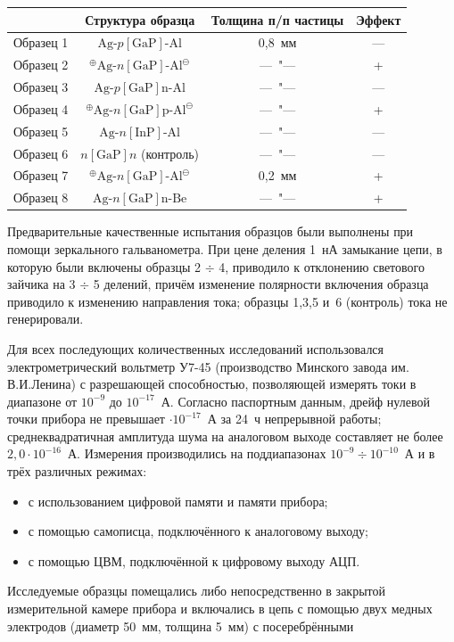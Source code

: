 \documentclass[12pt,a4paper]{article}
\begin{document}
\begin{table}[h]
\centering
\begin{tabular}{|l|c|c|c|}
\hline
& Структура образца & Толщина п/п частицы & Эффект \\
\hline
Образец 1 & $\text{Ag-}p[\text{GaP}]\text{-Al}$ & 0,8~мм & --- \\
Образец 2 & ${}^{\oplus}\text{Ag-}n[\text{GaP}]\text{-Al}^{\ominus}$ & ---~"--- & + \\
Образец 3 & $\text{Ag-}p[\text{GaP}]\text{n-Al}$ & ---~"--- & --- \\
Образец 4 & ${}^{\oplus}\text{Ag-}n[\text{GaP}]\text{p-Al}^{\ominus}$ & ---~"--- & + \\
Образец 5 & $\text{Ag-}n[\text{InP}]\text{-Al}$ & ---~"--- & --- \\
Образец 6 & $n[\text{GaP}]n$ (контроль) & ---~"--- & --- \\
Образец 7 & ${}^{\oplus}\text{Ag-}n[\text{GaP}]\text{-Al}^{\ominus}$ & 0,2~мм & + \\
Образец 8 & $\text{Ag-}n[\text{GaP}]\text{n-Be}$ & ---~"--- & + \\
\hline
\end{tabular}
\end{table}

Предварительные качественные испытания образцов были выполнены при помощи
зеркального гальванометра. При цене деления 1~нА замыкание цепи, в которую
были включены образцы 2 $\div$ 4, приводило к отклонению светового зайчика на
3 $\div$ 5 делений, причём изменение полярности включения образца приводило к
изменению направления тока; образцы 1,3,5 и~6 (контроль) тока не генерировали.

Для всех последующих количественных исследований использовался
электрометрический вольтметр У7-45 (производство Минского завода им.
В.И.Ленина) с разрешающей способностью, позволяющей измерять токи в диапазоне
от $10^{-9}$ до $10^{-17}$~А. Согласно паспортным данным, дрейф нулевой точки
прибора не превышает $\cdot 10^{-17}$~А за 24~ч непрерывной работы;
среднеквадратичная амплитуда шума на аналоговом выходе составляет не более
$2{,}0 \cdot 10^{-16}$~А. Измерения производились на поддиапазонах $10^{-9}
\div 10^{-10}$~А и в трёх различных режимах:
\begin{itemize}
  \item с использованием цифровой памяти и памяти прибора;
  \item с помощью самописца, подключённого к аналоговому выходу;
  \item с помощью ЦВМ, подключённой к цифровому выходу АЦП.
\end{itemize}
Исследуемые образцы помещались либо непосредственно в закрытой измерительной
камере прибора и включались в цепь с помощью двух медных электродов (диаметр
50~мм, толщина 5~мм) с посеребрёнными
\end{document}
